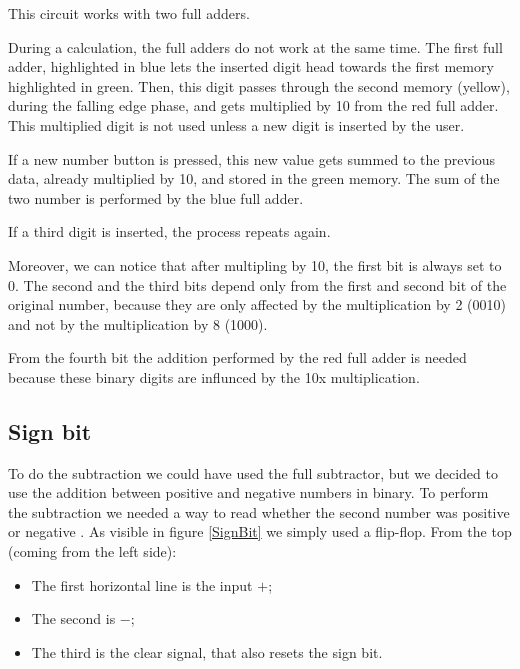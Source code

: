 \documentclass{article}
\begin{document}
This circuit works with two full adders.

\vspace{3mm}

During a calculation, the full adders do not work at the same time. The first full adder, highlighted in blue lets the inserted digit head towards the first memory highlighted in green. Then, this digit passes through the second memory (yellow), during the falling edge phase, and gets multiplied by 10 from the red full adder. This multiplied digit is not used unless a new digit is inserted by the user.

\vspace{3mm}

If a new number button is pressed, this new value gets summed to the previous data, already multiplied by 10, and stored in the green memory. The sum of the two number is performed by the blue full adder.

\vspace{3mm}

If a third digit is inserted, the process repeats again.

\vspace{3mm}

Moreover, we can notice that after multipling by 10, the first bit is always set to 0. The second and the third bits depend only from the first and second bit of the original number, because they are only affected by the multiplication by 2 (0010) and not by the multiplication by 8 (1000). 

From the fourth bit the addition performed by the red full adder is needed because these binary digits are influnced by the 10x multiplication. %






\subsection{Sign bit}

To do the subtraction we could have used the full subtractor, but we decided to use the addition between positive and negative numbers in binary. To perform the subtraction we needed a way to read whether the second number was positive or negative . As visible in figure \ref{SignBit} we simply used a flip-flop. From the top (coming from the left side):
\begin{itemize}
    \item The first horizontal line is the input $+$;
    \item The second is $-$;
    \item The third is the clear signal, that also resets the sign bit.
\end{itemize}
\end{document}
